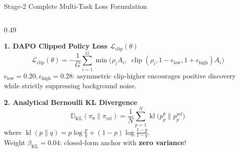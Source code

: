 \documentclass[aspectratio=169,10pt]{beamer}
\begin{document}
\begin{frame}{Stage-2 Complete Multi-Task Loss Formulation}
\vspace{-0.6em}
\begin{columns}[t]
    \begin{column}{0.49\textwidth}
        \begin{block}{\textbf{1. DAPO Clipped Policy Loss $\mathcal{L}_{\text{clip}}(\theta)$}}
            \scriptsize
            \vspace{-0.3em}
            \[
                \mathcal{L}_{\text{clip}}(\theta) = -\frac{1}{G}\sum_{i=1}^G \min\!\Big(\rho_i A_i, \; \operatorname{clip}(\rho_i, 1-\epsilon_{\text{low}}, 1+\epsilon_{\text{high}}) A_i\Big)
            \]
            \vspace{-0.5em}
            $\epsilon_{\text{low}} = 0.20, \epsilon_{\text{high}} = 0.28$: asymmetric clip-higher encourages positive discovery while strictly suppressing background noise.
        \end{block}

        \vspace{-0.3em}
        \begin{exampleblock}{\textbf{2. Analytical Bernoulli KL Divergence}}
            \scriptsize
            \vspace{-0.3em}
            \[
                \mathbb{D}_{\text{KL}}(\pi_\theta \parallel \pi_{\text{ref}}) = \frac{1}{N}\sum_{p=1}^N \operatorname{kl}\big(p_p^\theta \parallel p_p^{\text{ref}}\big)
            \]
            \vspace{-0.5em}
            where $\operatorname{kl}(p \parallel q) = p \log \frac{p}{q} + (1-p) \log \frac{1-p}{1-q}$.\\
            Weight $\beta_{\text{KL}} = 0.04$: closed-form anchor with \textbf{zero variance}!
        \end{exampleblock}
    \end{column}


\end{columns}
\end{frame}
\end{document}
